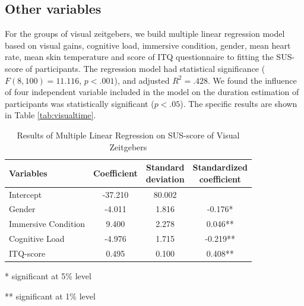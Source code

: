 \documentclass[sigconf]{acmart}
\begin{document}
\subsection*{Other variables}

For the groups of visual zeitgebers, we build multiple linear regression model based on visual gains, cognitive load, immersive condition, gender, mean heart rate, mean skin temperature and score of ITQ questionnaire to fitting the SUS-score of participants. The regression model had statistical significance ($F(8,100) = 11.116$, $p < .001$), and adjusted $R^2 = .428$. We found the influence of four independent variable included in the model on the duration estimation of participants was statistically significant ($p < .05$). The specific results are shown in Table \ref{tab:visualtime}.

\begin{table}[htbp] %
 \centering\small
 \begin{threeparttable}
 \caption{Results of Multiple Linear Regression on SUS-score of Visual Zeitgebers}
 \label{regression}
  \begin{tabular}{lccc} %
  \toprule %
  Variables         & Coefficient & \makecell[c]{Standard\\ deviation} & \makecell[c]{Standardized\\ coefficient} \\
  \midrule %
  Intercept          & -37.210 & 80.002  &         \\
  Gender             & -4.011   & 1.816   & -0.176*  \\
  Immersive Condition & 9.400   & 2.278   & 0.046**  \\
  Cognitive Load & -4.976   & 1.715   & -0.219**  \\
  ITQ-score & 0.495   & 0.100   & 0.408**  \\
  \bottomrule %
 \end{tabular}
  \label{tab:visualsus}
  \small
 \begin{tablenotes}
  \item[*] significant at 5\% level
  \item[**] significant at 1\% level
 \end{tablenotes}
 \end{threeparttable}
\end{table}
\end{document}
